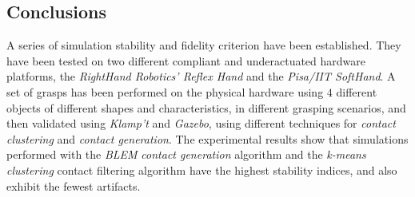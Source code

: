 \subsection{Conclusions}
A series of simulation stability and fidelity criterion have been established. They have been tested on two different compliant and underactuated hardware platforms, the \emph{RightHand Robotics' Reflex Hand} and the \emph{Pisa/IIT SoftHand}. A set of grasps has been performed on the physical hardware using $4$ different objects of different shapes and characteristics, in different grasping scenarios, and then validated using \emph{Klamp't} and \emph{Gazebo}, using different techniques for \emph{contact clustering} and \emph{contact generation}. The experimental results show that  simulations performed with the \emph{BLEM} \emph{contact generation} algorithm and the \emph{k-means clustering} contact filtering algorithm have the highest stability indices, and also exhibit the fewest artifacts.
